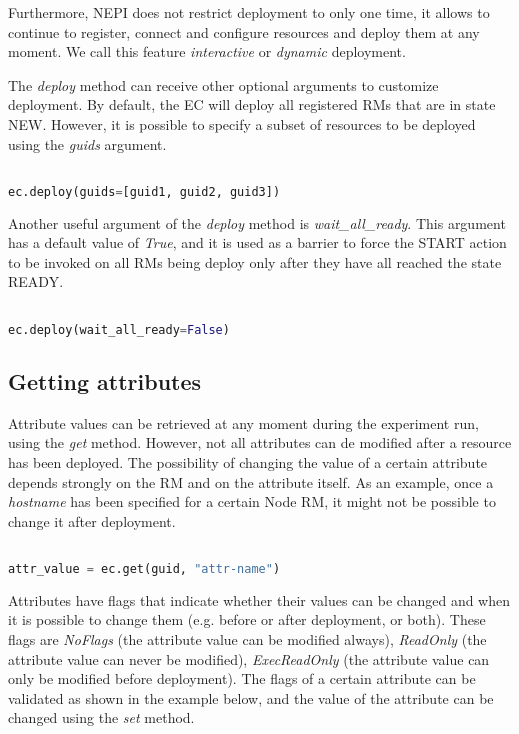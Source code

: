 Furthermore, NEPI does not restrict deployment to only one time, it allows
to continue to register, connect and configure resources and deploy them
at any moment. We call this feature \emph{interactive} or \emph{dynamic}
deployment. 

The \emph{deploy} method can receive other optional arguments to customize
deployment. By default, the EC will deploy all registered RMs that are in
state NEW. However, it is possible to specify a subset of resources to be
deployed using the \emph{guids} argument.

\begin{lstlisting}[language=Python]

ec.deploy(guids=[guid1, guid2, guid3])

\end{lstlisting}

Another useful argument of the \emph{deploy} method is \emph{wait\_all\_ready}.
This argument has a default value of \emph{True}, and it is used as a barrier
to force the START action to be invoked on all RMs being deploy only after
they have all reached the state READY.

\begin{lstlisting}[language=Python]

ec.deploy(wait_all_ready=False)

\end{lstlisting}


\subsection{Getting attributes}

Attribute values can be retrieved at any moment during the experiment run, 
using the \emph{get} method. 
However, not all attributes can de modified after a resource has
been deployed. The possibility of changing the value of a certain attribute 
depends strongly on the RM and on the attribute itself. 
As an example, once a \emph{hostname} has been specified for a certain Node 
RM, it might not be possible to change it after deployment.

\begin{lstlisting}[language=Python]

attr_value = ec.get(guid, "attr-name")

\end{lstlisting}

Attributes have flags that indicate whether their values can be changed
and when it is possible to change them (e.g. before or after deployment, 
or both). These flags are \emph{NoFlags} (the attribute value can be 
modified always), \emph{ReadOnly} (the attribute value can never be
modified), \emph{ExecReadOnly} (the attribute value can only be modified
before deployment). The flags of a certain attribute can be validated 
as shown in the example below, and the value of the attribute can be
changed using the \emph{set} method.  


